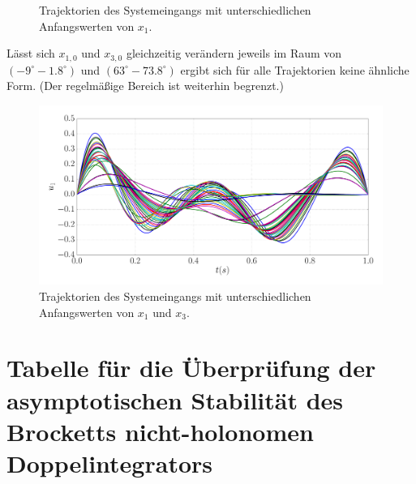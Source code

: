 \begin{appendices}
\begin{figure}[!h]
		\caption{Trajektorien des Systemeingangs mit unterschiedlichen Anfangswerten von $x_{1}$.}
		\label{fig:example4_x1_-005pi_005pi_u}
	\end{figure}
	Lässt sich $x_{1,0}$ und $x_{3,0}$ gleichzeitig verändern jeweils im Raum von $(-9^{\circ}-1.8^{\circ})$ und $(63^{\circ}-73.8^{\circ})$ ergibt sich für alle Trajektorien keine ähnliche Form. (Der regelmäßige Bereich ist weiterhin begrenzt.)
	\begin{figure}[!h]
		\centering
		\includegraphics[width=\linewidth]{bild/30_32/example4_x1_-005pi_001pi_x3_035pi_041pi_u.pdf}
		\caption{Trajektorien des Systemeingangs mit unterschiedlichen Anfangswerten von $x_{1}$ und $x_{3}$.}
		\label{fig:example4_x1_-005pi_001pi_x3_035pi_041pi_u}
	\end{figure}
	\clearpage
	\section{Tabelle für die Überprüfung der asymptotischen Stabilität des Brocketts nicht-holonomen Doppelintegrators}
	\label{sec:Tabelle_Brockett_e2}
	

\end{appendices}
